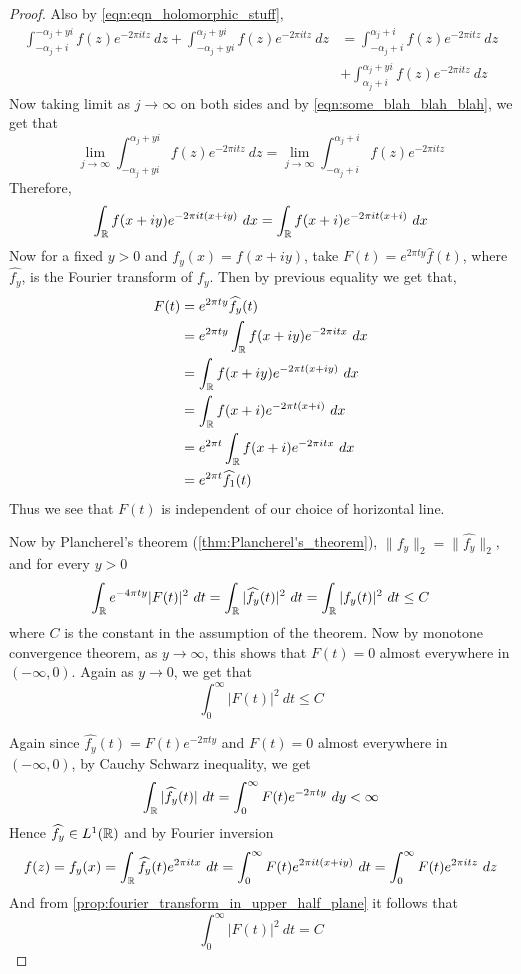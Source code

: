 \begin{proof}
  Also by \autoref{eqn:eqn_holomorphic_stuff},
  \begin{equation*}
    \begin{split}
      \int_{-\alpha_j+i}^{-\alpha_j +yi} f(z)e^{-2\pi it z} \ dz + \int_{-\alpha_j+yi}^{\alpha_j +yi} f(z)e^{-2\pi it z} \ dz &= \int_{-\alpha_j+i}^{\alpha_j +i} f(z)e^{-2\pi it z} \ dz \\
      &+ \int_{\alpha_j+i}^{\alpha_j +yi} f(z)e^{-2\pi it z} \ dz
    \end{split}
  \end{equation*}
  Now taking limit as $j \to \infty$ on both sides and by \autoref{eqn:some_blah_blah_blah}, we get that $$\lim_{j\to \infty} \int_{-\alpha_j+yi}^{\alpha_j +yi} f(z)e^{-2\pi it z} \ dz = \lim_{j \to \infty} \int_{-\alpha_j +i}^{\alpha_j +i} f(z)e^{-2\pi it z}$$
  Therefore,
  $$\int_\mathbb R f(x+iy)e^{-2\pi i t(x+iy)} \ dx = \int_\mathbb R f(x+i)e^{-2\pi it(x+i)} \ dx$$
  Now for a fixed $y>0$ and $f_y(x) = f(x+iy)$, take $F(t) = e^{2\pi ty}\widehat{f}(t)$, where $\widehat{f_y}$, is the Fourier transform of $f_y$. Then by previous equality we get that, 
  \begin{align*}
    F(t) &= e^{2\pi ty} \widehat{f_y}(t)\\
          &= e^{2\pi ty}\int_\mathbb R f(x+iy) e^{-2\pi itx} \ dx \\
          &= \int_\mathbb R f(x+iy)e^{-2\pi t(x+iy)} \ dx \\
          &= \int_\mathbb R f(x+i)e^{-2\pi t(x+i)} \ dx \\
          &= e^{2\pi t}\int_\mathbb R f(x+i) e^{-2\pi itx} \ dx \\
          &= e^{2\pi t} \widehat{f_1}(t) \\
  \end{align*}
  Thus we see that $F(t)$ is independent of our choice of horizontal line.
 
  Now by Plancherel's theorem (\autoref{thm:Plancherel's_theorem}), $\|f_y\|_2 = \|\widehat{f_y}\|_2$, and for every $y>0$
  $$\int_\mathbb R e^{-4 \pi t y} |F(t)|^2 \ dt = \int_\mathbb R |\widehat{f_y}(t)|^2 \ dt = \int_\mathbb R |f_y(t)|^2 \ dt \le C$$
  where $C$ is the constant in the assumption of the theorem.
  Now by monotone convergence theorem, as $y\to \infty$, this shows that $F(t) =0$ almost everywhere in $(-\infty, 0)$. Again as $y \to 0$, we get that $$\int_0^\infty |F(t)|^2 \ dt \le C$$

  Again since $\widehat{f_y}(t) = F(t)e^{-2\pi ty}$ and $F(t) = 0$ almost everywhere in $(-\infty, 0)$, by Cauchy Schwarz inequality, we get
  $$\int_\mathbb R |\widehat{f_y}(t)| \ dt = \int_{0}^\infty F(t) e^{-2\pi ty} \ dy < \infty$$
  Hence $\widehat{f_y} \in L^1(\mathbb R)$ and by Fourier inversion
  $$f(z) = f_y(x) = \int_\mathbb R \widehat{f_y}(t) e^{2\pi it x}\ dt = \int_0^\infty F(t)e^{2\pi it(x+iy)} \ dt = \int_{0}^\infty F(t)e^{2\pi itz} \ dz$$
  And from \autoref{prop:fourier_transform_in_upper_half_plane} it follows that $$\int_0^\infty |F(t)|^2 \ dt = C$$
\end{proof}

